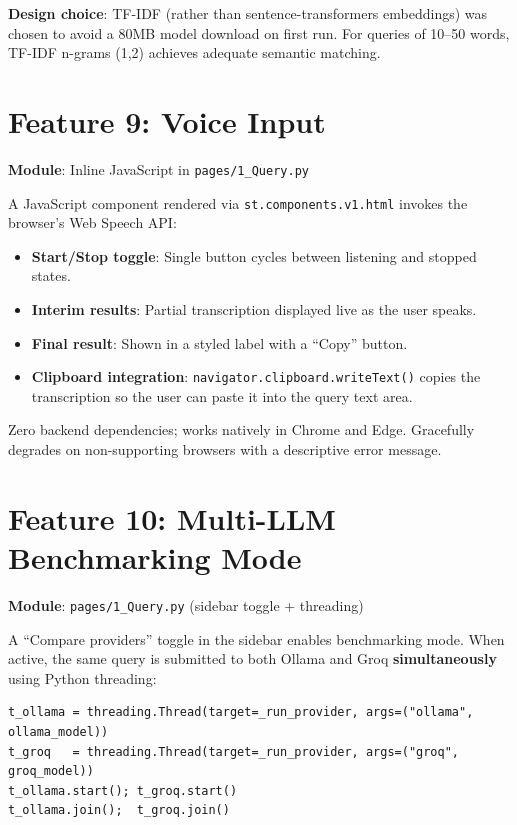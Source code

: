 \documentclass[12pt,a4paper]{report}
\begin{document}
\textbf{Design choice}: TF-IDF (rather than sentence-transformers embeddings) was chosen to
avoid a 80MB model download on first run. For queries of 10--50 words, TF-IDF n-grams (1,2)
achieves adequate semantic matching.

\section{Feature 9: Voice Input}

\textbf{Module}: Inline JavaScript in \texttt{pages/1\_Query.py}

A JavaScript component rendered via \texttt{st.components.v1.html} invokes the browser's
Web Speech API:

\begin{itemize}
  \item \textbf{Start/Stop toggle}: Single button cycles between listening and stopped states.
  \item \textbf{Interim results}: Partial transcription displayed live as the user speaks.
  \item \textbf{Final result}: Shown in a styled label with a ``Copy'' button.
  \item \textbf{Clipboard integration}: \texttt{navigator.clipboard.writeText()} copies the
        transcription so the user can paste it into the query text area.
\end{itemize}

Zero backend dependencies; works natively in Chrome and Edge. Gracefully degrades on
non-supporting browsers with a descriptive error message.

\section{Feature 10: Multi-LLM Benchmarking Mode}

\textbf{Module}: \texttt{pages/1\_Query.py} (sidebar toggle + threading)

A ``Compare providers'' toggle in the sidebar enables benchmarking mode. When active, the
same query is submitted to both Ollama and Groq \textbf{simultaneously} using Python threading:

\begin{lstlisting}[caption={Parallel provider execution}]
t_ollama = threading.Thread(target=_run_provider, args=("ollama", ollama_model))
t_groq   = threading.Thread(target=_run_provider, args=("groq",   groq_model))
t_ollama.start(); t_groq.start()
t_ollama.join();  t_groq.join()
\end{lstlisting}
\end{document}
